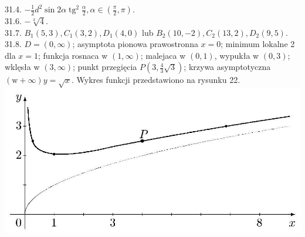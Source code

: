 \documentclass[10pt]{article}
\begin{document}
31.4. $-\frac{1}{2} d^{2} \sin 2 \alpha \operatorname{tg}^{2} \frac{\alpha}{2}, \alpha \in\left(\frac{\pi}{2}, \pi\right)$.\\
31.6. $-\sqrt[3]{4}$.\\
31.7. $B_{1}(5,3), C_{1}(3,2), D_{1}(4,0)$ lub $B_{2}(10,-2), C_{2}(13,2), D_{2}(9,5)$.\\
31.8. $D=(0, \infty)$; asymptota pionowa prawostronna $x=0$; minimum lokalne 2 dla $x=1$; funkcja rosnaca w $(1, \infty)$; malejaca w $(0,1)$, wypukła w $(0,3)$; wklęsła w $(3, \infty)$; punkt przegięcia $P\left(3, \frac{4}{3} \sqrt{3}\right)$; krzywa asymptotyczna $(\mathrm{w}+\infty) y=\sqrt{x}$. Wykres funkcji przedstawiono na rysunku 22.\\
\includegraphics[max width=\textwidth, center]{2024_11_16_fe5b564401bf7db98894g-077}
\end{document}
